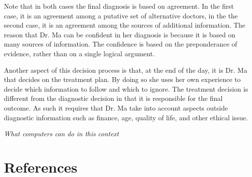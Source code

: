 \documentclass[11pt]{pnas-new}
\begin{document}
Note that in both cases the final diagnosis is based on agreement. In
the first case, it is an agreement among a putative set of alternative
doctors, in the the second case, it is an agreement among the sources of
additional information. The reason that Dr. Ma can be confident in her 
diagnosis is because it is based on many sources of information. The
confidence is based on the preponderance of evidence, rather than on a
single logical argument.  

Another aspect of this decision process is that, at the end of the
day, it is Dr. Ma that decides on the treatment plan. By doing so she
uses her own experience to decide which information to follow and
which to ignore. The treatment decision is different from the
diagnostic decision in that it is responsible for the final
outcome. As such it requires that Dr. Ma take into account aspects
outside diagnostic information such as finance, age, quality of life,
and other ethical issue.


{\em What computers can do in this context}

\section{References}
%  

\end{document}
